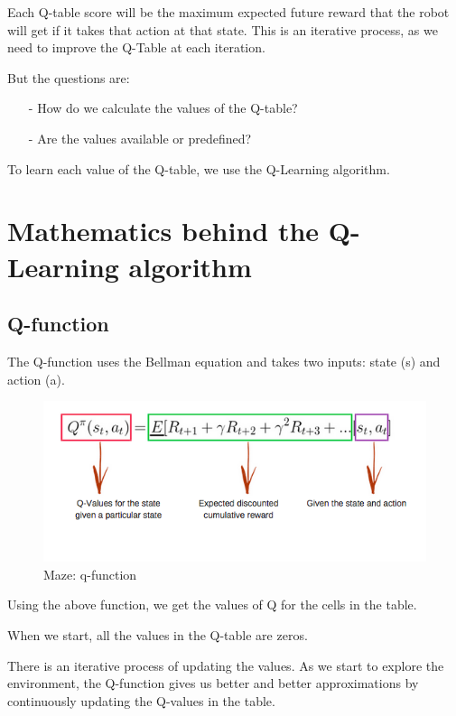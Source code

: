 Each Q-table score will be the maximum expected future reward that the robot will 
get if it takes that action at that state. This is an iterative process, as we need 
to improve the Q-Table at each iteration.

But the questions are:

\begin{itemize}
\setlength{\parskip}{0pt}
\item[-]
How do we calculate the values of the Q-table?
\item[-]
Are the values available or predefined?
\end{itemize}

To learn each value of the Q-table, we use the Q-Learning algorithm.


\section{Mathematics behind the Q-Learning algorithm}

\subsection{Q-function}

The Q-function uses the Bellman equation and takes two inputs: state (s) and action (a).

\begin{figure}[!htb]
\centering
\includegraphics[scale=0.618]{pix/q_learning/q_function.png}
\caption{Maze: q-function}
\end{figure}

Using the above function, we get the values of Q for the cells in the table.

When we start, all the values in the Q-table are zeros.

There is an iterative process of updating the values. As we start to explore the 
environment, the Q-function gives us better and better approximations by continuously 
updating the Q-values in the table.

